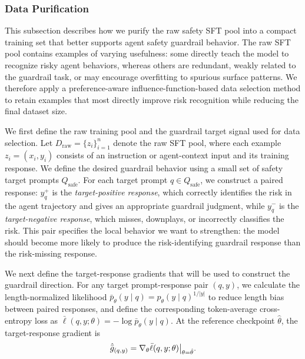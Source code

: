 \subsubsection{Data Purification}
\label{sec:data_purification}

This subsection describes how we purify the raw safety SFT pool into a compact training set that better supports agent safety guardrail behavior. The raw SFT pool contains examples of varying usefulness: some directly teach the model to recognize risky agent behaviors, whereas others are redundant, weakly related to the guardrail task, or may encourage overfitting to spurious surface patterns. We therefore apply a preference-aware influence-function-based data selection method \cite{lin2026preferenceawareinfluencefunctionbaseddataselection} to retain examples that most directly improve risk recognition while reducing the final dataset size.

We first define the raw training pool and the guardrail target signal used for data selection. Let \(D_{\mathrm{raw}}=\{z_i\}_{i=1}^{n}\) denote the raw SFT pool, where each example \(z_i=(x_i,y_i)\) consists of an instruction or agent-context input and its training response. We define the desired guardrail behavior using a small set of safety target prompts \(Q_{\mathrm{safe}}\). For each target prompt \(q\in Q_{\mathrm{safe}}\), we construct a paired response: \(y_q^{+}\) is the \emph{target-positive response}, which correctly identifies the risk in the agent trajectory and gives an appropriate guardrail judgment, while \(y_q^{-}\) is the \emph{target-negative response}, which misses, downplays, or incorrectly classifies the risk. This pair specifies the local behavior we want to strengthen: the model should become more likely to produce the risk-identifying guardrail response than the risk-missing response.

We next define the target-response gradients that will be used to construct the guardrail direction. For any target prompt-response pair \((q,y)\), we calculate the length-normalized likelihood \(\bar p_{\theta}(y\mid q)=p_{\theta}(y\mid q)^{1/|y|}\) to reduce length bias between paired responses, and define the corresponding token-average cross-entropy loss as \(\bar\ell(q,y;\theta)=-\log \bar p_{\theta}(y\mid q)\). At the reference checkpoint \(\hat\theta\), the target-response gradient is
\begin{equation}
\small
\hat{\bar g}_{(q,y)}
=
\nabla_\theta \bar\ell(q,y;\theta)\big|_{\theta=\hat\theta}.
\label{eq:guardrail-target-gradient}
\end{equation}

